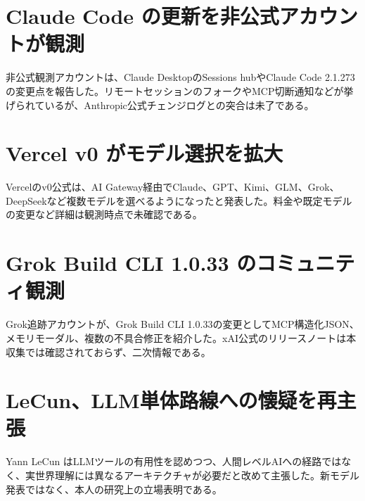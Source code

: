 \section{Claude Code の更新を非公式アカウントが観測}
非公式観測アカウントは、Claude DesktopのSessions hubやClaude Code 2.1.273の変更点を報告した。リモートセッションのフォークやMCP切断通知などが挙げられているが、Anthropic公式チェンジログとの突合は未了である。

\section{Vercel v0 がモデル選択を拡大}
Vercelのv0公式は、AI Gateway経由でClaude、GPT、Kimi、GLM、Grok、DeepSeekなど複数モデルを選べるようになったと発表した。料金や既定モデルの変更など詳細は観測時点で未確認である。

\section{Grok Build CLI 1.0.33 のコミュニティ観測}
Grok追跡アカウントが、Grok Build CLI 1.0.33の変更としてMCP構造化JSON、メモリモーダル、複数の不具合修正を紹介した。xAI公式のリリースノートは本収集では確認されておらず、二次情報である。

\section{LeCun、LLM単体路線への懐疑を再主張}
Yann LeCun はLLMツールの有用性を認めつつ、人間レベルAIへの経路ではなく、実世界理解には異なるアーキテクチャが必要だと改めて主張した。新モデル発表ではなく、本人の研究上の立場表明である。
